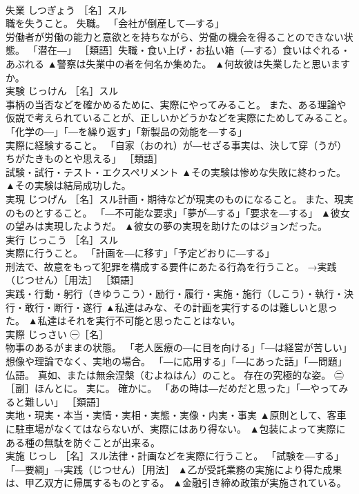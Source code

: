 \documentclass[8pt]{extreport}
\begin{document}
\begin{CJK}{UTF8}{min}
\\	失業	しつぎょう	［名］スル 
\\	職を失うこと。 失職。 「会社が倒産して―する」 
\\	労働者が労働の能力と意欲とを持ちながら、労働の機会を得ることのできない状態。 「潜在―」 ［類語］失職・食い上げ・お払い箱（―する）食いはぐれる・あぶれる	▲警察は失業中の者を何名か集めた。 ▲何故彼は失業したと思いますか。
\\	実験	じっけん	［名］スル 
\\	事柄の当否などを確かめるために、実際にやってみること。 また、ある理論や仮説で考えられていることが、正しいかどうかなどを実際にためしてみること。 「化学の―」「―を繰り返す」「新製品の効能を―する」 
\\	実際に経験すること。 「自家（おのれ）が―せざる事実は、決して穿（うが）ちがたきものとや思える」 ［類語］
\\	試験・試行・テスト・エクスペリメント	▲その実験は惨めな失敗に終わった。 ▲その実験は結局成功した。
\\	実現	じつげん	［名］スル計画・期待などが現実のものになること。 また、現実のものとすること。 「―不可能な要求」「夢が―する」「要求を―する」	▲彼女の望みは実現したようだ。 ▲彼女の夢の実現を助けたのはジョンだった。
\\	実行	じっこう	［名］スル 
\\	実際に行うこと。 「計画を―に移す」「予定どおりに―する」 
\\	刑法で、故意をもって犯罪を構成する要件にあたる行為を行うこと。 →実践（じつせん）［用法］ ［類語］
\\	実践・行動・躬行（きゆうこう）・励行・履行・実施・施行（しこう）・執行・決行・敢行・断行・遂行	▲私達はみな、その計画を実行するのは難しいと思った。 ▲私達はそれを実行不可能と思ったことはない。
\\	実際	じっさい	㊀［名］ 
\\	物事のあるがままの状態。 「老人医療の―に目を向ける」「―は経営が苦しい」 
\\	想像や理論でなく、実地の場合。 「―に応用する」「―にあった話」「―問題」 
\\	仏語。 真如、または無余涅槃（むよねはん）のこと。 存在の究極的な姿。 ㊁［副］ほんとに。 実に。 確かに。 「あの時は―だめだと思った」「―やってみると難しい」 ［類語］ 
\\	実地・現実・本当・実情・実相・実態・実像・内実・事実	▲原則として、客車に駐車場がなくてはならないが、実際にはあり得ない。 ▲包装によって実際にある種の無駄を防ぐことが出来る。
\\	実施	じっし	［名］スル法律・計画などを実際に行うこと。 「試験を―する」「―要綱」→実践（じつせん）［用法］	▲乙が受託業務の実施により得た成果は、甲乙双方に帰属するものとする。 ▲金融引き締め政策が実施されている。

\end{CJK}
\end{document}
